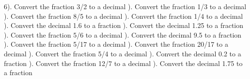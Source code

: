 \documentclass{article}%
\begin{document}
6). Convert the fraction 3/2 to a decimal%
\newline%
\newline%
). Convert the fraction 1/3 to a decimal%
\newline%
\newline%
). Convert the fraction 8/5 to a decimal%
\newline%
\newline%
). Convert the fraction 1/4 to a decimal%
\newline%
\newline%
). Convert the decimal 1.6 to a fraction%
\newline%
\newline%
). Convert the decimal 1.25 to a fraction%
\newline%
\newline%
). Convert the fraction 5/6 to a decimal%
\newline%
\newline%
). Convert the decimal 9.5 to a fraction%
\newline%
\newline%
). Convert the fraction 5/17 to a decimal%
\newline%
\newline%
). Convert the fraction 20/17 to a decimal%
\newline%
\newline%
). Convert the fraction 5/4 to a decimal%
\newline%
\newline%
). Convert the decimal 0.2 to a fraction%
\newline%
\newline%
). Convert the fraction 12/7 to a decimal%
\newline%
\newline%
). Convert the decimal 1.75 to a fraction%
\newline%
\end{document}
